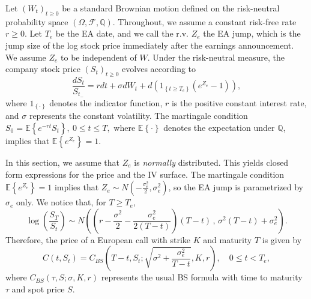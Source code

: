\documentclass[11pt]{article}
\numberwithin{equation}{section}
\numberwithin{theorem}{section}
\begin{document}
Let     $(W_{t})_{t \ge 0}$  be a standard Brownian motion defined
on the risk-neutral probability space $\left(\Omega,\mathcal{F},\mathbb{Q}\right)$. Throughout, we assume a constant risk-free rate $r\ge 0$.  Let $T_{e}$ be the
EA date, and we call the r.v.  $Z_{e}$ the EA jump, which is the jump size of the  log stock price immediately after the earnings announcement. We assume  $Z_{e}$ to be  independent of
$W$. Under  the risk-neutral measure, the company stock price $(S_{t})_{t \ge 0}$ evolves according to 
\begin{equation}
\frac{dS_{t}}{S_{t_{-}}}=rdt+\sigma dW_{t}+d\left(1_{\left\{ t\geq T_{e}\right\} }\left(e^{Z_{e}}-1\right)\right),\label{eq:GBMe}
\end{equation}
where $1_{\left\{ \cdot\right\} }$ denotes the indicator function,
$r$ is  the positive  constant interest rate, and $\sigma$
represents the constant volatility. The martingale condition $S_0=\mathbb{E}\left\{ e^{-rt}S_{t}\right\} ,\ 0\leq t\leq T,$ where $\mathbb{E}\left\{ \cdot\right\} $ denotes the expectation
under $\mathbb{Q}$, implies that $\mathbb{E}\left\{ e^{Z_{e}}\right\} =1$. 

In this section, we assume that $Z_{e}$ is \textit{normally} distributed.
This yields closed form expressions for the price and the IV
surface. The martingale
condition $\mathbb{E}\left\{ e^{Z_{e}}\right\} =1$ implies that $Z_{e}\sim N\left(-\frac{\sigma_{e}^{2}}{2},\sigma_{e}^{2}\right)$, so the EA jump is parametrized by $\sigma_{e}$ only. We notice
that, for $T\geq T_{e}$, 
\begin{equation}
{\log}\left(\frac{S_{T}}{S_{t}}\right) \sim N\left(\left(r-\frac{\sigma^{2}}{2}-\frac{\sigma_{e}^{2}}{2(T-t)}\right)(T-t)\,,\,{\sigma^{2}(T-t)+\sigma_{e}^{2}}\right).
\end{equation}
Therefore, the price of a European call with strike $K$ and maturity $T$ is
given by
\begin{equation}
C\left(t,S_{t}\right)=C_{BS}\left(T-t,S_{t};\sqrt{\sigma^{2}+\frac{\sigma_{e}^{2}}{T-t}},K,r\right),\quad0\leq t<T_{e},\label{eq:GBMe_price}
\end{equation}
where $C_{BS}\left(\tau,S;\sigma,K,r\right)$ represents the usual
BS formula with time to maturity $\tau$ and spot price $S$. 
\end{document}
